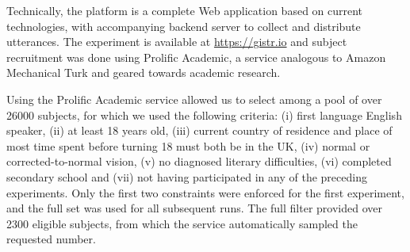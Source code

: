 \documentclass[a4paper,fleqn]{cas-dc}
\begin{document}
Technically, the platform is a complete Web application based on current
technologies, with accompanying backend server to collect and distribute
utterances.
The experiment is available at \url{https://gistr.io} and subject
recruitment was done using Prolific Academic, a service analogous to
Amazon Mechanical Turk and geared towards academic research.

Using the Prolific Academic service allowed us to select among a pool of
over \num{26000} subjects, for which we used the following criteria: (i) first language English speaker, (ii) at least 18 years old, (iii) current country of residence and place of most time spent before
  turning 18 must both be in the UK, (iv) normal or corrected-to-normal vision, (v) no diagnosed literary difficulties, (vi) completed secondary school and (vii) not having participated in any of the preceding experiments.
Only the first two constraints were enforced for the first experiment,
and the full set was used for all subsequent runs. The full filter
provided over \num{2300} eligible subjects, from which the service
automatically sampled the requested number.
\end{document}
